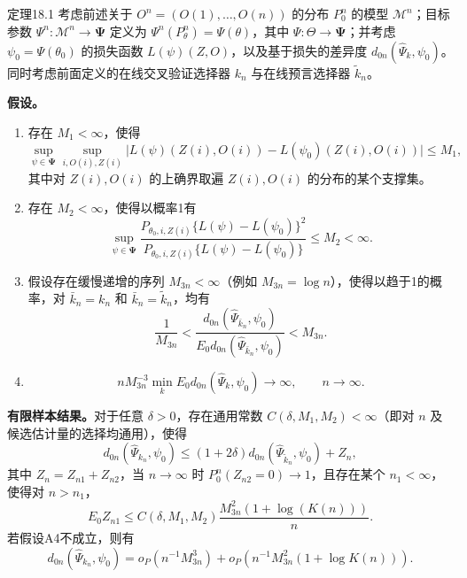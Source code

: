 \begin{bookresult}{定理}{18.1}
考虑前述关于 $O^n=(O(1),\ldots,O(n))$ 的分布 $P_0^n$ 的模型 $\mathcal M^n$；目标参数 $\Psi^n:\mathcal M^n\to\bm{\Psi}$ 定义为 $\Psi^n(P_\theta^n)=\Psi(\theta)$，其中 $\Psi:\Theta\to\bm{\Psi}$；并考虑 $\psi_0=\Psi(\theta_0)$ 的损失函数 $L(\psi)(Z,O)$，以及基于损失的差异度 $d_{0n}(\widehat\Psi_k,\psi_0)$。同时考虑前面定义的在线交叉验证选择器 $k_n$ 与在线预言选择器 $\widetilde k_n$。

\noindent\textbf{假设。}
\begin{enumerate}[label=A\arabic*.,leftmargin=2.8em]
\item 存在 $M_1<\infty$，使得
\[
 \sup_{\psi\in\bm{\Psi}}\sup_{i,O(i),Z(i)}
 \bigl|L(\psi)(Z(i),O(i))-L(\psi_0)(Z(i),O(i))\bigr|\le M_1,
\]
其中对 $Z(i),O(i)$ 的上确界取遍 $Z(i),O(i)$ 的分布的某个支撑集。
\item 存在 $M_2<\infty$，使得以概率1有
\begin{equation}
 \sup_{\psi\in\bm{\Psi}}
 \frac{P_{\theta_0,i,Z(i)}\{L(\psi)-L(\psi_0)\}^2}
 {P_{\theta_0,i,Z(i)}\{L(\psi)-L(\psi_0)\}}
 \le M_2<\infty.
 \tag{18.3}
\end{equation}
\item 假设存在缓慢递增的序列 $M_{3n}<\infty$（例如 $M_{3n}=\log n$），使得以趋于1的概率，对 $\bar k_n=k_n$ 和 $\bar k_n=\widetilde k_n$，均有
\[
 \frac{1}{M_{3n}}
 <\frac{d_{0n}(\widehat\Psi_{\bar k_n},\psi_0)}
 {E_0d_{0n}(\widehat\Psi_{\bar k_n},\psi_0)}
 <M_{3n}.
\]
\item
\[
 nM_{3n}^{-3}\min_k E_0d_{0n}(\widehat\Psi_k,\psi_0)
 \longrightarrow\infty,\qquad n\to\infty.
\]
\end{enumerate}

\noindent\textbf{有限样本结果。}对于任意 $\delta>0$，存在通用常数 $C(\delta,M_1,M_2)<\infty$（即对 $n$ 及候选估计量的选择均通用），使得
\[
 d_{0n}(\widehat\Psi_{k_n},\psi_0)
 \le(1+2\delta)d_{0n}(\widehat\Psi_{\widetilde k_n},\psi_0)+Z_n,
\]
其中 $Z_n=Z_{n1}+Z_{n2}$，当 $n\to\infty$ 时 $P_0^n(Z_{n2}=0)\to1$，且存在某个 $n_1<\infty$，使得对 $n>n_1$，
\[
 E_0Z_{n1}
 \le C(\delta,M_1,M_2)\frac{M_{3n}^2(1+\log(K(n)))}{n}.
\]
若假设A4不成立，则有
\[
 d_{0n}(\widehat\Psi_{k_n},\psi_0)
 =o_P(n^{-1}M_{3n}^3)+o_P(n^{-1}M_{3n}^2(1+\log K(n))).
\]
\end{bookresult}


